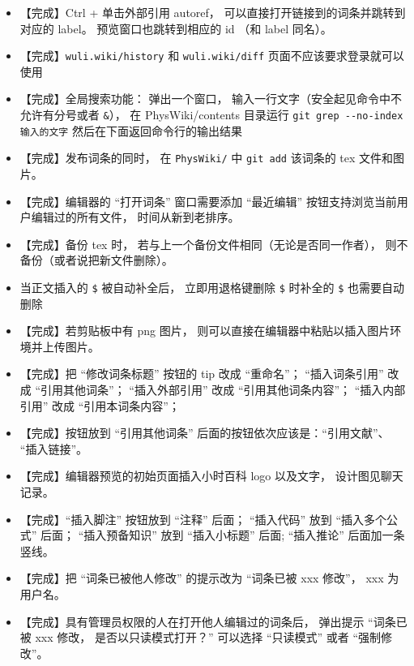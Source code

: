 \begin{itemize}
\item 【完成】Ctrl + 单击外部引用 autoref， 可以直接打开链接到的词条并跳转到对应的 label。 预览窗口也跳转到相应的 id （和 label 同名）。

\item 【完成】\verb|wuli.wiki/history| 和 \verb|wuli.wiki/diff| 页面不应该要求登录就可以使用

\item 【完成】全局搜索功能： 弹出一个窗口， 输入一行文字（安全起见命令中不允许有分号或者 \verb|&|）， 在 PhysWiki/contents 目录运行 \verb`git grep --no-index 输入的文字` 然后在下面返回命令行的输出结果

\item 【完成】发布词条的同时， 在 \verb|PhysWiki/| 中 \verb|git add| 该词条的 tex 文件和图片。

\item 【完成】编辑器的 “打开词条” 窗口需要添加 “最近编辑” 按钮支持浏览当前用户编辑过的所有文件， 时间从新到老排序。

\item 【完成】备份 tex 时， 若与上一个备份文件相同（无论是否同一作者）， 则不备份（或者说把新文件删除）。
\item 当正文插入的 \verb|$| 被自动补全后， 立即用退格键删除 \verb|$| 时补全的 \verb|$| 也需要自动删除

\item 【完成】若剪贴板中有 png 图片， 则可以直接在编辑器中粘贴以插入图片环境并上传图片。

\item 【完成】把 “修改词条标题” 按钮的 tip 改成 “重命名”； “插入词条引用” 改成 “引用其他词条”； “插入外部引用” 改成 “引用其他词条内容”； “插入内部引用” 改成 “引用本词条内容”；

\item 【完成】按钮放到 “引用其他词条” 后面的按钮依次应该是：“引用文献”、 “插入链接”。

\item 【完成】编辑器预览的初始页面插入小时百科 logo 以及文字， 设计图见聊天记录。

\item 【完成】“插入脚注” 按钮放到 “注释” 后面； “插入代码” 放到 “插入多个公式” 后面； “插入预备知识” 放到 “插入小标题” 后面; “插入推论” 后面加一条竖线。

\item 【完成】把 “词条已被他人修改” 的提示改为 “词条已被 xxx 修改”， xxx 为用户名。

\item 【完成】具有管理员权限的人在打开他人编辑过的词条后， 弹出提示 “词条已被 xxx 修改， 是否以只读模式打开？” 可以选择 “只读模式” 或者 “强制修改”。


\end{itemize}
